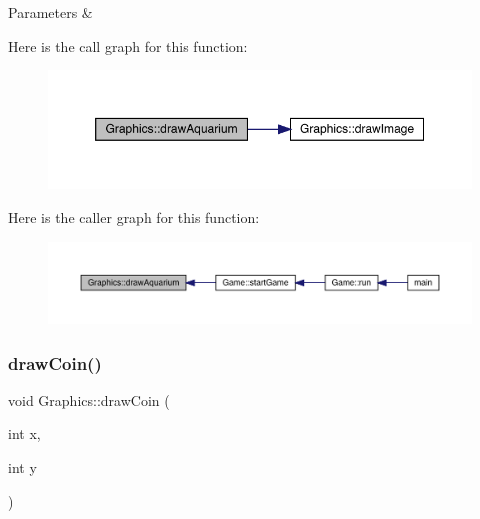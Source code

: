 \begin{DoxyParams}{Parameters}
{\em } & \\
\hline
\end{DoxyParams}
Here is the call graph for this function\+:\nopagebreak
\begin{figure}[H]
\begin{center}
\leavevmode
\includegraphics[width=350pt]{class_graphics_a5f3a657a7c54f13108bd90e6a85bd02e_cgraph}
\end{center}
\end{figure}
Here is the caller graph for this function\+:\nopagebreak
\begin{figure}[H]
\begin{center}
\leavevmode
\includegraphics[width=350pt]{class_graphics_a5f3a657a7c54f13108bd90e6a85bd02e_icgraph}
\end{center}
\end{figure}
\mbox{\label{class_graphics_a62b98d9f52ad55e9bd8617130cfbf37b}} 
\subsubsection{\texorpdfstring{draw\+Coin()}{drawCoin()}}
{\footnotesize\ttfamily void Graphics\+::draw\+Coin (\begin{DoxyParamCaption}\item[{int}]{x,  }\item[{int}]{y }\end{DoxyParamCaption})}

